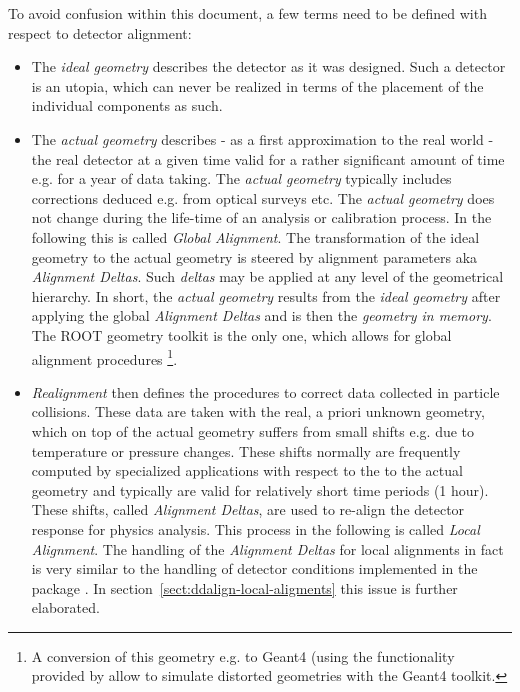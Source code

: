 \documentclass[10pt,a4paper]{article}
\begin{document}
\noindent
To avoid confusion within this document, a few terms need to be defined
with respect to detector alignment:
\begin{itemize}\itemcompact
\item The {\it{ideal geometry}} describes the detector as it was designed.
    Such a detector is an utopia, which can never be realized in terms
    of the placement of the individual components as such.
\item The {\it{actual geometry}} describes - as a first approximation 
    to the real world - the real detector at a given time valid for a rather
    significant amount of time  e.g. for a year of data taking.
    The {\it{actual geometry}} typically includes corrections deduced 
    e.g. from optical surveys etc. The {\it{actual geometry}} does not 
    change during the life-time of an analysis or calibration process. 
    In the following this is called {\it{Global Alignment}}. 
    The transformation of the ideal geometry to the actual geometry 
    is steered by alignment parameters aka {\it{Alignment Deltas}}. 
    Such {\it{deltas}} may be applied at any level of the geometrical 
    hierarchy. 
    In short, the {\it{actual geometry}} results from the {\it{ideal geometry}}
    after applying the global {\it{Alignment Deltas}} and is then 
    the {\it{geometry in memory}}. The ROOT geometry
    toolkit is the only one, which allows for global alignment procedures
    \footnote{A conversion of this geometry e.g. to Geant4 (using the functionality
    provided by \DDG allow to simulate distorted geometries with the Geant4 toolkit.}.
\item {\it{Realignment}} then defines the procedures to correct data 
    collected in particle collisions. These data are taken with the real, 
    a priori unknown geometry, which on top of the actual geometry suffers 
    from small shifts e.g. due to temperature or pressure changes. These 
    shifts normally are frequently computed by specialized applications 
    with respect to the to the actual geometry and typically are valid 
    for relatively short time periods (1 hour). These shifts, called 
    {\it{Alignment Deltas}}, are used to re-align the detector response 
    for physics analysis. This process in the following is called 
    {\it{Local Alignment}}.
    The handling of the {\it{Alignment Deltas}} for local alignments in fact 
    is very similar to the handling of detector conditions implemented in the
    package \DDC\cite{bib:DDCond}. 
    In section~\ref{sect:ddalign-local-aligments} 
    this issue is further elaborated.
\end{itemize}
\end{document}
